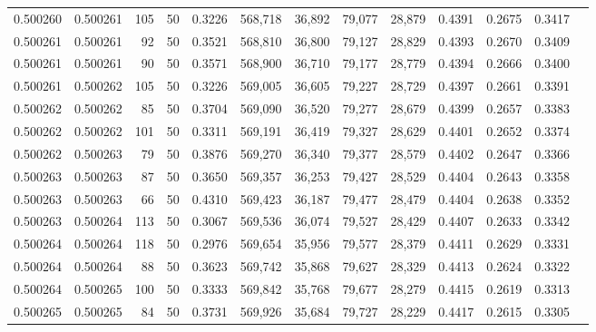 \begin{tabular}{rrrrrrrrrrrrr}
0.500260 & 0.500261 &   105 &  50 &                                     0.3226 & 568,718 &  36,892 &  79,077 &  28,879 & 0.4391 & 0.2675 & 0.3417 \\
0.500261 & 0.500261 &    92 &  50 &                                     0.3521 & 568,810 &  36,800 &  79,127 &  28,829 & 0.4393 & 0.2670 & 0.3409 \\
0.500261 & 0.500261 &    90 &  50 &                                     0.3571 & 568,900 &  36,710 &  79,177 &  28,779 & 0.4394 & 0.2666 & 0.3400 \\
0.500261 & 0.500262 &   105 &  50 &                                     0.3226 & 569,005 &  36,605 &  79,227 &  28,729 & 0.4397 & 0.2661 & 0.3391 \\
0.500262 & 0.500262 &    85 &  50 &                                     0.3704 & 569,090 &  36,520 &  79,277 &  28,679 & 0.4399 & 0.2657 & 0.3383 \\
0.500262 & 0.500262 &   101 &  50 &                                     0.3311 & 569,191 &  36,419 &  79,327 &  28,629 & 0.4401 & 0.2652 & 0.3374 \\
0.500262 & 0.500263 &    79 &  50 &                                     0.3876 & 569,270 &  36,340 &  79,377 &  28,579 & 0.4402 & 0.2647 & 0.3366 \\
0.500263 & 0.500263 &    87 &  50 &                                     0.3650 & 569,357 &  36,253 &  79,427 &  28,529 & 0.4404 & 0.2643 & 0.3358 \\
0.500263 & 0.500263 &    66 &  50 &                                     0.4310 & 569,423 &  36,187 &  79,477 &  28,479 & 0.4404 & 0.2638 & 0.3352 \\
0.500263 & 0.500264 &   113 &  50 &                                     0.3067 & 569,536 &  36,074 &  79,527 &  28,429 & 0.4407 & 0.2633 & 0.3342 \\
0.500264 & 0.500264 &   118 &  50 &                                     0.2976 & 569,654 &  35,956 &  79,577 &  28,379 & 0.4411 & 0.2629 & 0.3331 \\
0.500264 & 0.500264 &    88 &  50 &                                     0.3623 & 569,742 &  35,868 &  79,627 &  28,329 & 0.4413 & 0.2624 & 0.3322 \\
0.500264 & 0.500265 &   100 &  50 &                                     0.3333 & 569,842 &  35,768 &  79,677 &  28,279 & 0.4415 & 0.2619 & 0.3313 \\
0.500265 & 0.500265 &    84 &  50 &                                     0.3731 & 569,926 &  35,684 &  79,727 &  28,229 & 0.4417 & 0.2615 & 0.3305 \\

\end{tabular}

